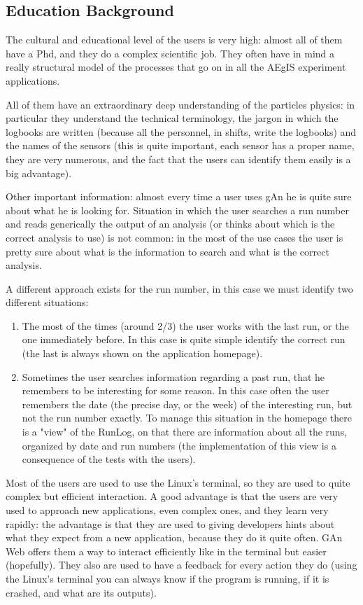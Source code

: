 \subsection{Education Background}
The cultural and educational level of the users is very high: almost all of them have a Phd, and they do a complex scientific job. They often have in mind a really structural model of the processes that go on in all the AEgIS experiment applications.

All of them have an extraordinary deep understanding of the particles physics: in particular they understand the technical terminology, the jargon in which the logbooks are written (because all the personnel, in shifts, write the logbooks) and the names of the sensors (this is quite important, each sensor has a proper name, they are very numerous, and the fact that the users can identify them easily is a big advantage). 

Other important information: almost every time a user uses gAn he is quite sure about what he is looking for. Situation in which the user searches a run number and reads generically the output of an analysis (or thinks about which is the correct analysis to use) is not common: in the most of the use cases the user is pretty sure about what is the information to search and what is the correct analysis. 

A different approach exists for the run number, in this case we must identify two different situations:

\begin{enumerate}

\item The most of the times (around 2/3) the user works with the last run, or the one immediately before. In this case is quite simple identify the correct run (the last is always shown on the application homepage).
\item Sometimes the user searches information regarding a past run, that he remembers to be interesting for some reason. In this case often the user remembers the date (the precise day, or the week) of the interesting run, but not the run number exactly. To manage this situation in the homepage there is a "view" of the RunLog, on that there are information about all the runs, organized by date and run numbers (the implementation of this view is a consequence of the tests with the users). 

\end{enumerate}

Most of the users are used to use the Linux's terminal, so they are used to quite complex but efficient interaction. A good advantage is that the users are very used to approach new applications, even complex ones, and they learn very rapidly: the advantage is that they are used to giving developers hints about what they expect from a new application, because they do it quite often. GAn Web offers them a way to interact efficiently like in the terminal but easier (hopefully). They also are used to have a feedback for every action they do (using the Linux's terminal you can always know if the program is running, if it is crashed, and what are its outputs).

